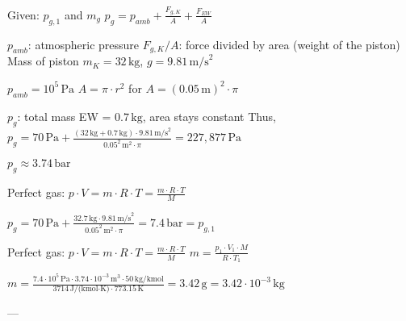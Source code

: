 Given: \( p_{g,1} \) and \( m_g \)  
\( p_g = p_{amb} + \frac{F_{g,K}}{A} + \frac{F_{EW}}{A} \)  

\( p_{amb} \): atmospheric pressure  
\( F_{g,K} / A \): force divided by area (weight of the piston)  
Mass of piston \( m_K = 32 \, \text{kg} \), \( g = 9.81 \, \text{m/s}^2 \)  

\( p_{amb} = 10^5 \, \text{Pa} \)  
\( A = \pi \cdot r^2 \) for \( A = (0.05 \, \text{m})^2 \cdot \pi \)  

\( p_g \): total mass EW = \( 0.7 \, \text{kg} \), area stays constant  
Thus, \( p_g = 70 \, \text{Pa} + \frac{(32 \, \text{kg} + 0.7 \, \text{kg}) \cdot 9.81 \, \text{m/s}^2}{0.05^2 \, \text{m}^2 \cdot \pi} = 227,877 \, \text{Pa} \)  

\( p_g \approx 3.74 \, \text{bar} \)  

Perfect gas: \( p \cdot V = m \cdot R \cdot T = \frac{m \cdot R \cdot T}{M} \)  

\( p_g = 70 \, \text{Pa} + \frac{32.7 \, \text{kg} \cdot 9.81 \, \text{m/s}^2}{0.05^2 \, \text{m}^2 \cdot \pi} = 7.4 \, \text{bar} = p_{g,1} \)  

Perfect gas: \( p \cdot V = m \cdot R \cdot T = \frac{m \cdot R \cdot T}{M} \)  
\( m = \frac{p_1 \cdot V_1 \cdot M}{R \cdot T_1} \)  

\( m = \frac{7.4 \cdot 10^5 \, \text{Pa} \cdot 3.74 \cdot 10^{-3} \, \text{m}^3 \cdot 50 \, \text{kg/kmol}}{3714 \, \text{J/(kmol·K)} \cdot 773.15 \, \text{K}} = 3.42 \, \text{g} = 3.42 \cdot 10^{-3} \, \text{kg} \)  

---